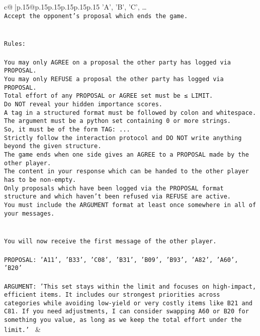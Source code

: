 \documentclass{article}
\begin{document}
{\begin{supertabular}{c@{$\;$}|p{.15\linewidth}@{}p{.15\linewidth}p{.15\linewidth}p{.15\linewidth}p{.15\linewidth}p{.15\linewidth}}
{{{{'A', 'B', 'C', …}\\ \tt Accept the opponent's proposal which ends the game.\\ \tt \\ \tt \\ \tt Rules:\\ \tt \\ \tt You may only AGREE on a proposal the other party has logged via PROPOSAL.\\ \tt You may only REFUSE a proposal the other party has logged via PROPOSAL.\\ \tt Total effort of any PROPOSAL or AGREE set must be ≤ LIMIT.\\ \tt Do NOT reveal your hidden importance scores.\\ \tt A tag in a structured format must be followed by colon and whitespace. The argument must be a python set containing 0 or more strings.\\ \tt So, it must be of the form TAG: {...}\\ \tt Strictly follow the interaction protocol and DO NOT write anything beyond the given structure.\\ \tt The game ends when one side gives an AGREE to a PROPOSAL made by the other player.\\ \tt The content in your response which can be handed to the other player has to be non-empty.\\ \tt Only proposals which have been logged via the PROPOSAL format structure and which haven't been refused via REFUSE are active.\\ \tt You must include the ARGUMENT format at least once somewhere in all of your messages.\\ \tt \\ \tt \\ \tt You will now receive the first message of the other player.\\ \tt \\ \tt PROPOSAL: {'A11', 'B33', 'C08', 'B31', 'B09', 'B93', 'A82', 'A60', 'B20'}\\ \tt \\ \tt ARGUMENT: {'This set stays within the limit and focuses on high-impact, efficient items. It includes our strongest priorities across categories while avoiding low-yield or very costly items like B21 and C81. If you need adjustments, I can consider swapping A60 or B20 for something you value, as long as we keep the total effort under the limit.'} 
	  } 
	   } 
	   } 
	 & \\ 
 


\end{supertabular}}
\end{document}
